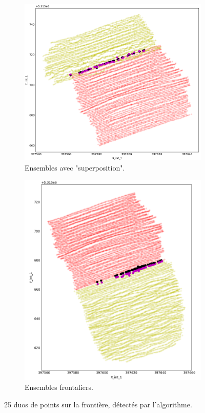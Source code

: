 \documentclass[12pt]{article}
\begin{document}
    \begin{figure}[ht!]
        \centering
        \begin{subfigure}[b]{0.475\textwidth}
            \centering
            \includegraphics[width=\textwidth]{Images/Frontiere_pts1-3.png}
            \caption[]%
            {{ \small Ensembles avec "superposition".}}    
        \end{subfigure}
        \hfill
        \begin{subfigure}[b]{0.475\textwidth}  
            \centering 
            \includegraphics[width=\textwidth]{Images/Frontiere_pts1-2.png}
            \caption[]%
            {{\small Ensembles frontaliers.}}    
        \end{subfigure}
        \caption{25 duos de points sur la frontière, détectés par l'algorithme.}
    \end{figure}
    
\end{document}
